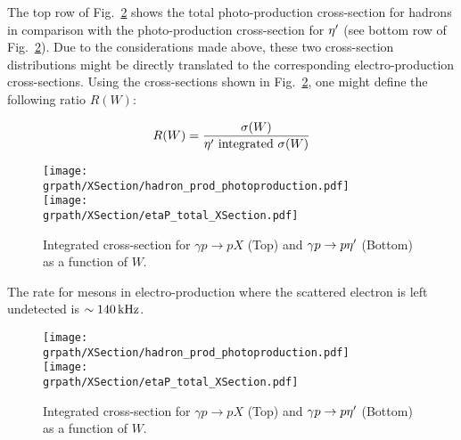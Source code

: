 The top row of Fig.~\ref{fig:EtaPProdX} shows the total photo-production cross-section for hadrons in comparison with the photo-production cross-section for $\eta^{\prime}$ (see bottom row of Fig.~\ref{fig:EtaPProdX}). Due to the considerations made above, these two cross-section distributions might be directly translated to the corresponding electro-production cross-sections. Using the cross-sections shown in Fig.~\ref{fig:EtaPProdX}, one might define the following ratio $R(W)$:

\begin{equation}
 R(W) = \frac{\sigma(W)}{\eta^{\prime}\text{ integrated } \sigma(W)}
\label{XsecR}
\end{equation}

\begin{figure}[h!]\begin{center}
		\texttt{[image: \\grpath/XSection/hadron\_prod\_photoproduction.pdf]}\\
		\texttt{[image: \\grpath/XSection/etaP\_total\_XSection.pdf]}
		\caption[etaP phot-prod. XSection]{\label{fig:EtaPProdX}{Integrated cross-section for $\gamma p\rightarrow pX$ (Top) and $\gamma p\rightarrow p\eta^{\prime}$ (Bottom) as a function of $W$.}}
\end{center}\end{figure}

The rate for mesons in electro-production where the scattered electron is left undetected is $\sim 140\,\rm{kHz}$. 

\begin{figure}[h!]\begin{center}
		\texttt{[image: \\grpath/XSection/hadron\_prod\_photoproduction.pdf]}\\
		\texttt{[image: \\grpath/XSection/etaP\_total\_XSection.pdf]}
		\caption[etaP phot-prod. XSection]{\label{fig:EtaPProdX}{Integrated cross-section for $\gamma p\rightarrow pX$ (Top) and $\gamma p\rightarrow p\eta^{\prime}$ (Bottom) as a function of $W$.}}
\end{center}\end{figure}

\FloatBarrier





